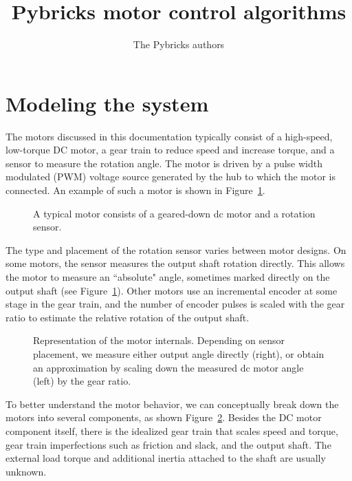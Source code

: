 \documentclass[12pt, a4paper]
{article}
\title{Pybricks motor control algorithms}
\author{The Pybricks authors}
\begin{document}
\maketitle

\tableofcontents
\pagebreak

\section{Modeling the system}

The motors discussed in this documentation typically consist of a high-speed,
low-torque DC motor, a gear train to reduce speed and increase torque, and a
sensor to measure the rotation angle. The motor is driven by a pulse width
modulated (PWM) voltage source generated by the hub to which the motor is
connected. An example of such a motor is shown in Figure~\ref{fig:motor}.

\begin{figure}[H]
    \centering
    
    \caption{A typical motor consists of a geared-down dc motor and a
    rotation sensor. \label{fig:motor}}
\end{figure}

The type and placement of the rotation sensor varies between motor designs. On
some motors, the sensor measures the output shaft rotation directly. This
allows the motor to measure an ``absolute" angle, sometimes marked directly on
the output shaft (see Figure~\ref{fig:motor}). Other motors use an incremental
encoder at some stage in the gear train, and the number of encoder pulses
is scaled with the gear ratio to estimate the relative rotation of the output
shaft.

\begin{figure}[H]
    \centering
    
    \caption{ Representation of the motor internals. Depending on sensor
        placement, we measure either output angle directly (right), or obtain
        an approximation by scaling down the measured dc motor angle (left) by
        the gear ratio. \label{fig:motor-model-overview}}
\end{figure}


To better understand the motor behavior, we can conceptually break down the
motors into several components, as shown Figure~\ref{fig:motor-model-overview}.
Besides the DC motor component itself, there is the idealized gear train that
scales speed and torque, gear train imperfections such as friction and slack,
and the output shaft. The external load torque and additional inertia attached
to the shaft are usually unknown.
\end{document}
